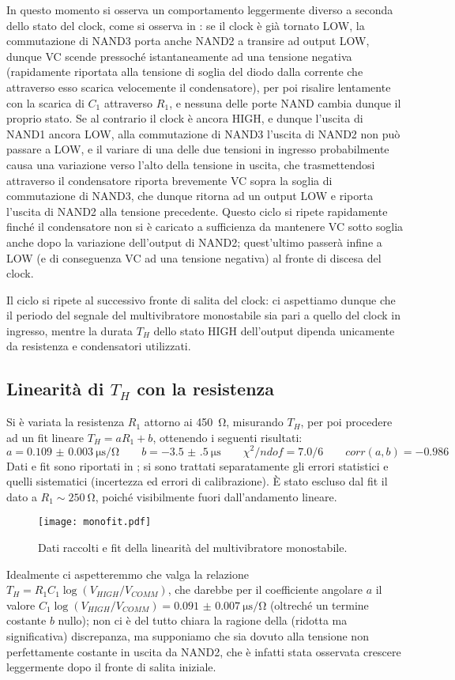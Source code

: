 In questo momento si osserva un comportamento leggermente diverso a seconda
dello stato del clock, come si osserva in : se il clock è già tornato LOW, la commutazione di NAND3
porta anche NAND2 a transire ad output LOW, dunque VC scende pressoché
istantaneamente ad una tensione negativa (rapidamente riportata alla tensione
di soglia del diodo dalla corrente che attraverso esso scarica velocemente il
condensatore), per poi risalire lentamente con la scarica di $C_1$ attraverso
$R_1$, e nessuna delle porte NAND cambia dunque il proprio stato.
Se al contrario il clock è ancora HIGH, e dunque l'uscita di NAND1 ancora LOW,
alla commutazione di NAND3 l'uscita di NAND2 non può passare a LOW, e il variare
di una delle due tensioni in ingresso probabilmente causa una variazione verso
l'alto della tensione in uscita, che trasmettendosi
attraverso il condensatore riporta brevemente VC sopra la soglia di
commutazione di NAND3, che dunque ritorna ad un output LOW e riporta l'uscita
di NAND2 alla tensione precedente. Questo ciclo si ripete rapidamente finché
il condensatore non si è caricato a sufficienza da mantenere VC sotto soglia
anche dopo la variazione dell'output di NAND2; quest'ultimo passerà infine a
LOW (e di conseguenza VC ad una tensione negativa) al fronte di discesa del
clock.

Il ciclo si ripete al successivo fronte di salita del clock: ci aspettiamo
dunque che il periodo del segnale del multivibratore monostabile sia pari a
quello del clock in ingresso, mentre la durata $T_H$ dello stato HIGH
dell'output dipenda unicamente da resistenza e condensatori utilizzati.

\subsection{Linearità di $T_H$ con la resistenza}

Si è variata la resistenza $R_1$ attorno ai \SI{450}{\ohm}, misurando $T_H$, per
poi procedere ad un fit lineare $T_H = a R_1 + b$, ottenendo i seguenti risultati:
$$a = \SI{0.109(3)}{\micro\second \per \ohm} \qquad b=\SI{-3.5(5)}{\micro \second} \qquad \chi^2/ndof = 7.0/6 \qquad corr(a,b)= -0.986$$
Dati e fit sono riportati in ; si sono trattati separatamente gli
errori statistici e quelli sistematici (incertezza ed errori di calibrazione).
È stato escluso dal fit il dato a $R_1 \sim \SI{250}{\ohm}$, poiché
visibilmente fuori dall'andamento lineare.

\begin{figure}[h]
	\texttt{[image: monofit.pdf]}
	\caption{Dati raccolti e fit della linearità del multivibratore monostabile.}
	\label{monofit}
\end{figure}

Idealmente ci aspetteremmo che valga la relazione
$ T_H = R_1 C_1 \log (V_{HIGH}/V_{COMM}) $,
che darebbe per il coefficiente angolare $a$ il valore
$ C_1 \log (V_{HIGH}/V_{COMM}) = \SI{0.091(7)}{\us\per\ohm}$ (oltreché
un termine costante $b$ nullo); non ci è del tutto
chiara la ragione della (ridotta ma significativa) discrepanza, ma supponiamo
che sia dovuto alla tensione non perfettamente costante in uscita da NAND2, che
è infatti stata osservata crescere leggermente dopo il fronte di
salita iniziale.
